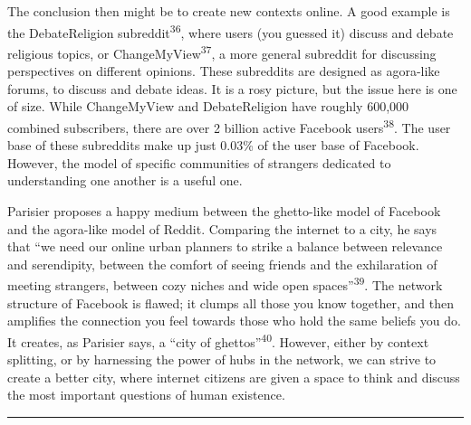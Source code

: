 \documentclass[]{article}
\begin{document}
The conclusion then might be to create new contexts online. A good
example is the DebateReligion subreddit\textsuperscript{36}, where users
(you guessed it) discuss and debate religious topics, or
ChangeMyView\textsuperscript{37}, a more general subreddit for
discussing perspectives on different opinions. These subreddits are
designed as agora-like forums, to discuss and debate ideas. It is a rosy
picture, but the issue here is one of size. While ChangeMyView and
DebateReligion have roughly 600,000 combined subscribers, there are over
2 billion active Facebook users\textsuperscript{38}. The user base of
these subreddits make up just 0.03\% of the user base of Facebook.
However, the model of specific communities of strangers dedicated to
understanding one another is a useful one.

Parisier proposes a happy medium between the ghetto-like model of
Facebook and the agora-like model of Reddit. Comparing the internet to a
city, he says that ``we need our online urban planners to strike a
balance between relevance and serendipity, between the comfort of seeing
friends and the exhilaration of meeting strangers, between cozy niches
and wide open spaces''\textsuperscript{39}. The network structure of
Facebook is flawed; it clumps all those you know together, and then
amplifies the connection you feel towards those who hold the same
beliefs you do. It creates, as Parisier says, a ``city of
ghettos''\textsuperscript{40}. However, either by context splitting, or
by harnessing the power of hubs in the network, we can strive to create
a better city, where internet citizens are given a space to think and
discuss the most important questions of human existence.

\begin{center}\rule{0.5\linewidth}{\linethickness}\end{center}
\end{document}
